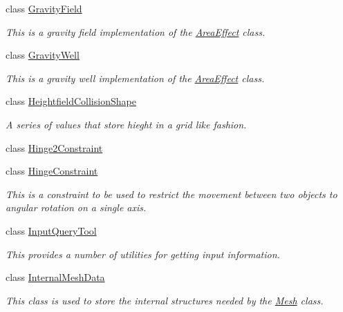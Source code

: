 \begin{DoxyCompactItemize}
class \hyperlink{classMezzanine_1_1GravityField}{GravityField}
\begin{DoxyCompactList}\small\item\em This is a gravity field implementation of the \hyperlink{classMezzanine_1_1AreaEffect}{AreaEffect} class. \item\end{DoxyCompactList}\item 
class \hyperlink{classMezzanine_1_1GravityWell}{GravityWell}
\begin{DoxyCompactList}\small\item\em This is a gravity well implementation of the \hyperlink{classMezzanine_1_1AreaEffect}{AreaEffect} class. \item\end{DoxyCompactList}\item 
class \hyperlink{classMezzanine_1_1HeightfieldCollisionShape}{HeightfieldCollisionShape}
\begin{DoxyCompactList}\small\item\em A series of values that store hieght in a grid like fashion. \item\end{DoxyCompactList}\item 
class \hyperlink{classMezzanine_1_1Hinge2Constraint}{Hinge2Constraint}
\item 
class \hyperlink{classMezzanine_1_1HingeConstraint}{HingeConstraint}
\begin{DoxyCompactList}\small\item\em This is a constraint to be used to restrict the movement between two objects to angular rotation on a single axis. \item\end{DoxyCompactList}\item 
class \hyperlink{classMezzanine_1_1InputQueryTool}{InputQueryTool}
\begin{DoxyCompactList}\small\item\em This provides a number of utilities for getting input information. \item\end{DoxyCompactList}\item 
class \hyperlink{classMezzanine_1_1InternalMeshData}{InternalMeshData}
\begin{DoxyCompactList}\small\item\em This class is used to store the internal structures needed by the \hyperlink{classMezzanine_1_1Mesh}{Mesh} class. \item\end{DoxyCompactList}\item 

\end{DoxyCompactItemize}
